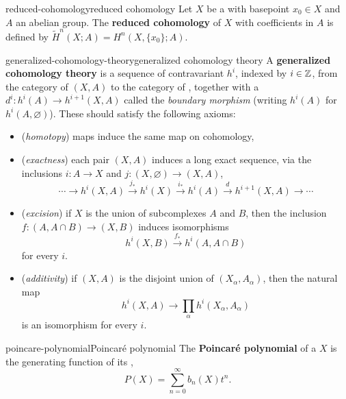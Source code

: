 \begin{topic}{reduced-cohomology}{reduced cohomology}
    Let $X$ be a  with basepoint $x_0 \in X$ and $A$ an abelian group. The \textbf{reduced cohomology} of $X$ with coefficients in $A$ is defined by $\tilde{H}^n(X; A) = H^n(X, \{ x_0 \}; A)$.
\end{topic}

\begin{topic}{generalized-cohomology-theory}{generalized cohomology theory}
    A \textbf{generalized cohomology theory} is a sequence of contravariant  $h^i$, indexed by $i \in \mathbb{Z}$, from the category of  $(X, A)$ to the category of , together with a  $d^i : h^i(A) \to h^{i + 1}(X, A)$ called the \textit{boundary morphism} (writing $h^i(A)$ for $h^i(A, \varnothing)$). These should satisfy the following axioms:
    \begin{itemize}
        \item (\textit{homotopy})  maps induce the same map on cohomology,
        \item (\textit{exactness}) each pair $(X, A)$ induces a long exact sequence, via the inclusions $i : A \to X$ and $j : (X, \varnothing) \to (X, A)$,
        \[ \cdots \rightarrow h^i(X, A) \xrightarrow{j_*} h^i(X) \xrightarrow{i_*} h^i(A) \xrightarrow{d} h^{i + 1}(X, A) \rightarrow \cdots \]
        \item (\textit{excision}) if $X$ is the union of subcomplexes $A$ and $B$, then the inclusion $f : (A, A \cap B) \to (X, B)$ induces isomorphisms
        \[ h^i(X, B) \xrightarrow{f_*} h^i(A, A \cap B) \]
        for every $i$.
        \item (\textit{additivity}) if $(X, A)$ is the disjoint union of $(X_\alpha, A_\alpha)$, then the natural map
        \[ h^i(X, A) \to \prod_\alpha h^i(X_\alpha, A_\alpha) \]
        is an isomorphism for every $i$.
    \end{itemize}
\end{topic}

\begin{topic}{poincare-polynomial}{Poincaré polynomial}
    The \textbf{Poincaré polynomial} of a  $X$ is the generating function of its ,
    \[ P(X) = \sum_{n = 0}^\infty b_n(X) t^n . \]
\end{topic}

